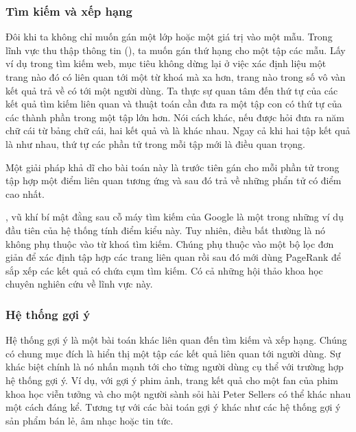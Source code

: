 \documentclass[letterpaper,11pt,english]{sphinxmanual}
\begin{document}
\subsubsection{Tìm kiếm và xếp hạng}
\label{\detokenize{chapter_introduction/index_vn:tim-kiem-va-xep-hang}}


Đôi khi ta không chỉ muốn gán một lớp hoặc một giá trị vào một mẫu.
Trong lĩnh vực thu thập thông tin (), ta muốn gán
thứ hạng cho một tập các mẫu. Lấy ví dụ trong tìm kiếm web, mục tiêu
không dừng lại ở việc xác định liệu một trang nào đó có liên quan tới
một từ khoá mà xa hơn, trang nào trong số vô vàn kết quả trả về có  tới một người dùng. Ta thực sự quan tâm đến thứ tự của các
kết quả tìm kiếm liên quan và thuật toán cần đưa ra một tập con có thứ
tự của các thành phần trong một tập lớn hơn. Nói cách khác, nếu được hỏi
đưa ra năm chữ cái từ bảng chữ cái, hai kết quả  và
 là khác nhau. Ngay cả khi hai tập kết quả là như nhau, thứ
tự các phần tử trong mỗi tập mới là điều quan trọng.



Một giải pháp khả dĩ cho bài toán này là trước tiên gán cho mỗi phần tử
trong tập hợp một điểm liên quan tương ứng và sau đó trả về những phẩn
tử có điểm cao nhất.
%
\begin{footnote}[34]\sphinxAtStartFootnote
{}
%
\end{footnote}, vũ khí bí mật
đằng sau cỗ máy tìm kiếm của Google là một trong những ví dụ đầu tiên
của hệ thống tính điểm kiểu này. Tuy nhiên, điều bất thường là nó không
phụ thuộc vào từ khoá tìm kiếm. Chúng phụ thuộc vào một bộ lọc đơn giản
để xác định tập hợp các trang liên quan rồi sau đó mới dùng PageRank để
sắp xếp các kết quả có chứa cụm tìm kiếm. Có cả những hội thảo khoa học
chuyên nghiên cứu về lĩnh vực này.








\subsubsection{Hệ thống gợi ý}
\label{\detokenize{chapter_introduction/index_vn:he-thong-goi-y}}


Hệ thống gợi ý là một bài toán khác liên quan đến tìm kiếm và xếp hạng.
Chúng có chung mục đích là hiển thị một tập các kết quả liên quan tới
người dùng. Sự khác biệt chính là nó nhấn mạnh tới  cho
từng người dùng cụ thể với trường hợp hệ thống gợi ý. Ví dụ, với gợi ý
phim ảnh, trang kết quả cho một fan của phim khoa học viễn tưởng và cho
một người sành sỏi hài Peter Sellers có thể khác nhau một cách đáng kể.
Tương tự với các bài toán gợi ý khác như các hệ thống gợi ý sản phẩm bán
lẻ, âm nhạc hoặc tin tức.
\end{document}

